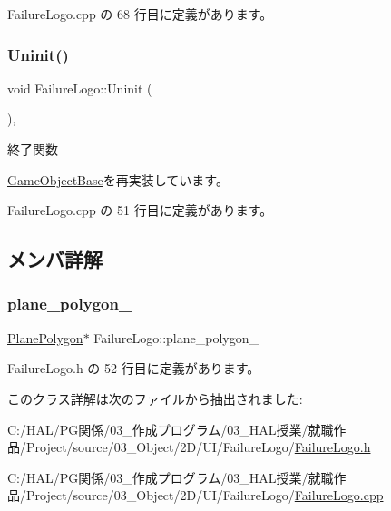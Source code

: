  Failure\+Logo.\+cpp の 68 行目に定義があります。

\mbox{\label{class_failure_logo_adbe01fc4567ade0e788f511f5162299c}} 
\subsubsection{\texorpdfstring{Uninit()}{Uninit()}}
{\footnotesize\ttfamily void Failure\+Logo\+::\+Uninit (\begin{DoxyParamCaption}{ }\end{DoxyParamCaption})\hspace{0.3cm}{\ttfamily [override]}, {\ttfamily [virtual]}}



終了関数 



\mbox{\hyperlink{class_game_object_base_a97e1bc277d7b1c0156d4735de29a022c}{Game\+Object\+Base}}を再実装しています。



 Failure\+Logo.\+cpp の 51 行目に定義があります。



\subsection{メンバ詳解}
\mbox{\label{class_failure_logo_ab41feac9836e9687c75546098ff8f53c}} 
\subsubsection{\texorpdfstring{plane\+\_\+polygon\+\_\+}{plane\_polygon\_}}
{\footnotesize\ttfamily \mbox{\hyperlink{class_plane_polygon}{Plane\+Polygon}}$\ast$ Failure\+Logo\+::plane\+\_\+polygon\+\_\+}



 Failure\+Logo.\+h の 52 行目に定義があります。



このクラス詳解は次のファイルから抽出されました\+:\begin{DoxyCompactItemize}
\item 
C\+:/\+H\+A\+L/\+P\+G関係/03\+\_\+作成プログラム/03\+\_\+\+H\+A\+L授業/就職作品/\+Project/source/03\+\_\+\+Object/2\+D/\+U\+I/\+Failure\+Logo/\mbox{\hyperlink{_failure_logo_8h}{Failure\+Logo.\+h}}\item 
C\+:/\+H\+A\+L/\+P\+G関係/03\+\_\+作成プログラム/03\+\_\+\+H\+A\+L授業/就職作品/\+Project/source/03\+\_\+\+Object/2\+D/\+U\+I/\+Failure\+Logo/\mbox{\hyperlink{_failure_logo_8cpp}{Failure\+Logo.\+cpp}}\end{DoxyCompactItemize}
